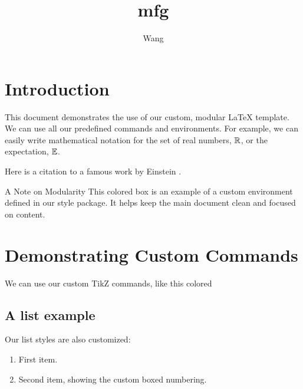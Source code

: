 \documentclass{e_class_thesis}
\begin{document}
\author{Wang}
\title{mfg}
\maketitle

\section{Introduction}

This document demonstrates the use of our custom, modular \LaTeX{} template. 
We can use all our predefined commands and environments. For example, we can easily write mathematical notation for the set of real numbers, $\mathbb{R}$, or the expectation, $\mathbb{E}$.

Here is a citation to a famous work by Einstein \cite{einstein1905}.

\begin{special_columns}{A Note on Modularity}
    This colored box is an example of a custom environment defined in our style package. It helps keep the main document clean and focused on content.
\end{special_columns}

\section{Demonstrating Custom Commands}

We can use our custom TikZ commands, like this colored 

\subsection{A list example}
Our list styles are also customized:
\begin{enumerate}
    \item First item.
    \item Second item, showing the custom boxed numbering.
\end{enumerate}
\end{document}
